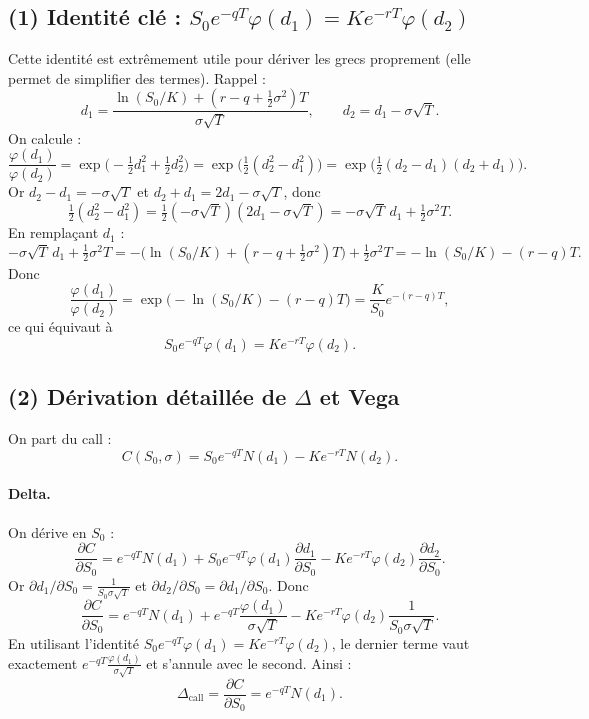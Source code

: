 
\subsection*{(1) Identité clé : $S_0e^{-qT}\varphi(d_1)=Ke^{-rT}\varphi(d_2)$}
Cette identité est extrêmement utile pour dériver les grecs proprement (elle permet de simplifier des termes).
Rappel :
\[
d_1=\frac{\ln(S_0/K)+(r-q+\tfrac12\sigma^2)T}{\sigma\sqrt{T}},
\qquad
d_2=d_1-\sigma\sqrt{T}.
\]
On calcule :
\[
\frac{\varphi(d_1)}{\varphi(d_2)}
=\exp\Big(-\tfrac12 d_1^2+\tfrac12 d_2^2\Big)
=\exp\Big(\tfrac12(d_2^2-d_1^2)\Big)
=\exp\Big(\tfrac12(d_2-d_1)(d_2+d_1)\Big).
\]
Or $d_2-d_1=-\sigma\sqrt{T}$ et $d_2+d_1=2d_1-\sigma\sqrt{T}$, donc
\[
\tfrac12(d_2^2-d_1^2)=\tfrac12(-\sigma\sqrt{T})(2d_1-\sigma\sqrt{T})
=-\sigma\sqrt{T}\,d_1+\tfrac12\sigma^2T.
\]
En remplaçant $d_1$ :
\[
-\sigma\sqrt{T}\,d_1+\tfrac12\sigma^2T
=-\Big(\ln(S_0/K)+(r-q+\tfrac12\sigma^2)T\Big)+\tfrac12\sigma^2T
=-\ln(S_0/K)-(r-q)T.
\]
Donc
\[
\frac{\varphi(d_1)}{\varphi(d_2)}=\exp\big(-\ln(S_0/K)-(r-q)T\big)=\frac{K}{S_0}e^{-(r-q)T},
\]
ce qui équivaut à
\[
\boxed{S_0e^{-qT}\varphi(d_1)=Ke^{-rT}\varphi(d_2).}
\]

\subsection*{(2) Dérivation détaillée de $\Delta$ et Vega}
On part du call :
\[
C(S_0,\sigma)=S_0e^{-qT}N(d_1)-Ke^{-rT}N(d_2).
\]
\paragraph{Delta.}
On dérive en $S_0$ :
\[
\frac{\partial C}{\partial S_0}
=e^{-qT}N(d_1)+S_0e^{-qT}\varphi(d_1)\frac{\partial d_1}{\partial S_0}
-Ke^{-rT}\varphi(d_2)\frac{\partial d_2}{\partial S_0}.
\]
Or $\partial d_1/\partial S_0 = \frac{1}{S_0\sigma\sqrt{T}}$ et $\partial d_2/\partial S_0=\partial d_1/\partial S_0$.
Donc
\[
\frac{\partial C}{\partial S_0}
=e^{-qT}N(d_1)+e^{-qT}\frac{\varphi(d_1)}{\sigma\sqrt{T}}
-Ke^{-rT}\varphi(d_2)\frac{1}{S_0\sigma\sqrt{T}}.
\]
En utilisant l'identité $S_0e^{-qT}\varphi(d_1)=Ke^{-rT}\varphi(d_2)$, le dernier terme vaut exactement
$e^{-qT}\frac{\varphi(d_1)}{\sigma\sqrt{T}}$ et s'annule avec le second.
Ainsi :
\[
\boxed{\Delta_{\mathrm{call}}=\frac{\partial C}{\partial S_0}=e^{-qT}N(d_1).}
\]

